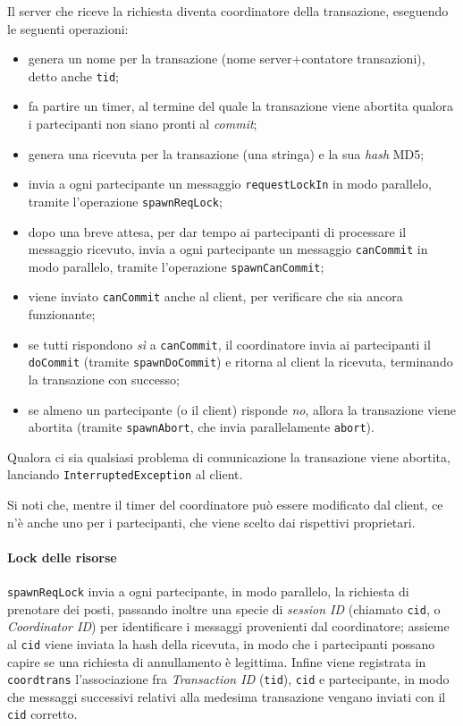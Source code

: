 \documentclass[a4paper]{article}
\begin{document}
Il server che riceve la richiesta diventa coordinatore della transazione, eseguendo le seguenti operazioni:
\begin{itemize}
	\item genera un nome per la transazione (nome server+contatore transazioni), detto anche \texttt{tid};
	\item fa partire un timer, al termine del quale la transazione viene abortita qualora i partecipanti non siano pronti al \textit{commit};
	\item genera una ricevuta per la transazione (una stringa) e la sua \textit{hash} MD5;
	\item invia a ogni partecipante un messaggio \texttt{requestLockIn} in modo parallelo, tramite l'operazione \texttt{spawnReqLock};
	\item dopo una breve attesa, per dar tempo ai partecipanti di processare il messaggio ricevuto, invia a ogni partecipante un messaggio \texttt{canCommit} in modo parallelo, tramite l'operazione \texttt{spawnCanCommit};
	\item viene inviato \texttt{canCommit} anche al client, per verificare che sia ancora funzionante;
	\item se tutti rispondono \textit{sì} a \texttt{canCommit}, il coordinatore invia ai partecipanti il \texttt{doCommit} (tramite \texttt{spawnDoCommit}) e ritorna al client la ricevuta, terminando la transazione con successo;
	\item se almeno un partecipante (o il client) risponde \textit{no}, allora la transazione viene abortita (tramite \texttt{spawnAbort}, che invia parallelamente \texttt{abort}).
\end{itemize}

Qualora ci sia qualsiasi problema di comunicazione la transazione viene abortita, lanciando \texttt{InterruptedException} al client. 

Si noti che, mentre il timer del coordinatore può essere modificato dal client, ce n'è anche uno per i partecipanti, che viene scelto dai rispettivi proprietari.

\paragraph{Lock delle risorse}\texttt{spawnReqLock} invia a ogni partecipante, in modo parallelo, la richiesta di prenotare dei posti, passando inoltre una specie di \textit{session ID} (chiamato \texttt{cid}, o \textit{Coordinator ID}) per identificare i messaggi provenienti dal coordinatore; %
assieme al \texttt{cid} viene inviata la hash della ricevuta, in modo che i partecipanti possano capire se una richiesta di annullamento è legittima. %
Infine viene registrata in \texttt{coordtrans} l'associazione fra \textit{Transaction ID} (\texttt{tid}), \texttt{cid} e partecipante, in modo che messaggi successivi relativi alla medesima transazione vengano inviati con il \texttt{cid} corretto.
\end{document}
